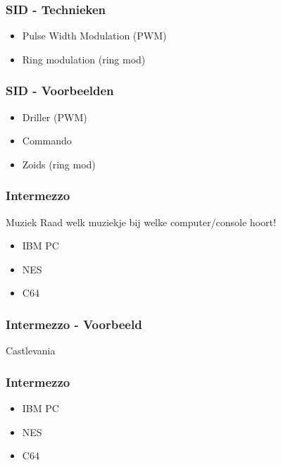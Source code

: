 
\begin{frame}
\frametitle{SID - Technieken}

\begin{itemize}
\item Pulse Width Modulation (PWM)
\item Ring modulation (ring mod)
\end{itemize}

\end{frame}


\begin{frame}
\frametitle{SID - Voorbeelden}

\begin{itemize}
\item Driller (PWM)
\item Commando
\item Zoids (ring mod)
\end{itemize}

\end{frame}


\begin{frame}
\frametitle{Intermezzo}

\begin{block}{Muziek}
Raad welk muziekje bij welke computer/console hoort!
\end{block}

\begin{itemize}
\item IBM PC
\item NES
\item C64
\end{itemize}

\end{frame}


\begin{frame}
\frametitle{Intermezzo - Voorbeeld}

Castlevania

\end{frame}


\begin{frame}
\frametitle{Intermezzo}

\begin{itemize}
\item IBM PC
\item NES
\item C64
\end{itemize}

\end{frame}

